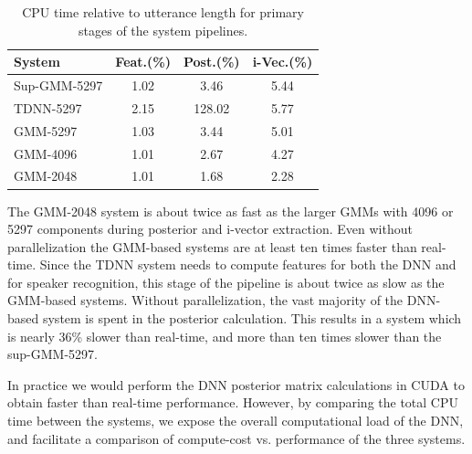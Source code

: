 \documentclass{article}
\begin{document}
\begin{table}
\caption{CPU time relative to utterance length for primary stages of the system pipelines.}
\begin{center}
\begin{tabular}{l|ccc}
\hline
System & Feat.(\%) & Post.(\%) & i-Vec.(\%)\\ \hline \hline
Sup-GMM-5297 & 1.02 & 3.46 & 5.44 \\
TDNN-5297 & 2.15 & 128.02 & 5.77  \\
GMM-5297 & 1.03 & 3.44 & 5.01 \\
GMM-4096 & 1.01 & 2.67 & 4.27 \\
GMM-2048 & 1.01 & 1.68 & 2.28 \\ \hline
\end{tabular}
\end{center}
\label{timing}
\end{table}


The GMM-2048 system is about twice as fast as the
larger GMMs with 4096 or 5297 components during posterior and i-vector
extraction. Even without
parallelization the GMM-based systems are at least ten times faster than
real-time. Since the TDNN system needs to compute features for both the
DNN and for speaker recognition, this stage of the pipeline is about twice
as slow as the GMM-based systems.
Without parallelization, the vast majority of the DNN-based system is spent 
in the posterior calculation. This results in a system which is nearly 36\% slower 
than real-time, and more than ten times slower than the sup-GMM-5297.

In practice we would perform the DNN posterior matrix calculations in
CUDA to obtain faster than real-time performance.
However, by comparing the total CPU time between the systems, we 
expose the overall computational load of the DNN, and facilitate
a comparison of compute-cost vs. performance of the three systems. 
\end{document}
